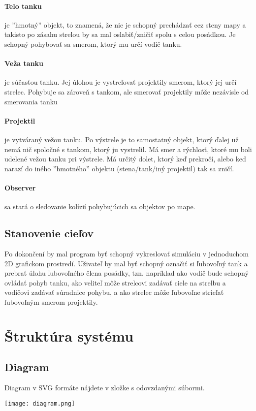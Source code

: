 \documentclass[12pt,oneside,slovak,a4paper]{article}
\begin{document}
\paragraph{Telo tanku} je ''hmotný'' objekt, to znamená, že nie je schopný prechádzať cez steny mapy a takisto po zásahu strelou by sa mal oslabiť/zničiť spolu s celou posádkou. Je schopný pohybovať sa smerom, ktorý mu určí vodič tanku.

\paragraph{Veža tanku} je súčasťou tanku. Jej úlohou je vystreľovať projektily smerom, ktorý jej určí strelec. Pohybuje sa zároveň s tankom, ale smerovať projektily môže nezávisle od smerovania tanku

\paragraph{Projektil} je vytváraný vežou tanku. Po výstrele je to samostatný objekt, ktorý ďalej už nemá nič spoločné s tankom, ktorý ju vystrelil. Má smer a rýchlosť, ktoré mu boli udelené vežou tanku pri výstrele. Má určitý dolet, ktorý keď prekročí, alebo keď narazí do iného ''hmotného'' objektu (stena/tank/iný projektil) tak sa zničí.

\paragraph{Observer} sa stará o sledovanie kolízií pohybujúcich sa objektov po mape.

\subsection{Stanovenie cieľov}
Po dokončení by mal program byť schopný vykreslovať simuláciu v jednoduchom 2D grafickom prostredí. Uživateľ by mal byť schopný označiť si ľubovoľný tank a prebrať úlohu ľubovoľného člena posádky, tzn. napríklad ako vodič bude schopný ovládať pohyb tanku, ako veliteľ môže strelcovi zadávať ciele na strelbu a vodičovi zadávať súradnice pohybu, a ako strelec môže ľubovoľne strieľať ľubovoľným smerom projektily.

\section{Štruktúra systému}
\subsection{Diagram}
Diagram v SVG formáte nájdete v zložke s odovzdanými súbormi.
\begin{center}
\texttt{[image: diagram.png]}
\end{center}
\end{document}
